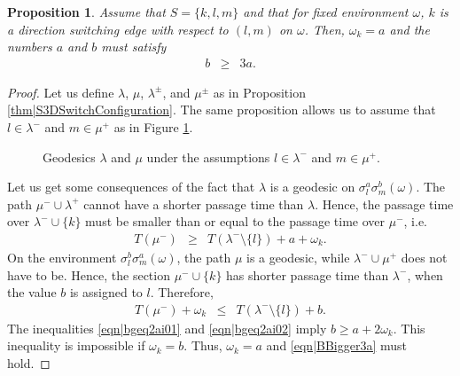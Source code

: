 \documentclass[reqno]{amsart}
\newtheorem{proposition}[theorem]{Proposition}
\begin{document}
\begin{proposition}\label{thm|dSwitchImpliesOmegaKEqA}
Assume that $S=\{k,l,m\}$ and that for fixed environment $\omega$, $k$ is a direction switching edge with respect to 
$(l,m)$ on $\omega$. Then, $\omega_k=a$ and the numbers $a$ and $b$ must satisfy 
\begin{eqnarray} b&\geq&3a.\label{eqn|BBigger3a}
\end{eqnarray}
\end{proposition}
\begin{proof} 
Let us define $\lambda$, $\mu$, $\lambda^{\pm}$, and $\mu^{\pm}$ as in Proposition \ref{thm|S3DSwitchConfiguration}. The same proposition allows us to assume that $l\in \lambda^-$ and $m\in \mu^+$ as in Figure \ref{fig|DSwitchNonTrivialCase}.

 \begin{figure}[t]
 \centering
{}
\caption{Geodesics $\lambda$ and $\mu$ under the assumptions $l\in\lambda^-$ and $m\in \mu^+$.}
\label{fig|DSwitchNonTrivialCase}
\end{figure}
Let us get some consequences of the fact that $\lambda$ is a geodesic on 
$\sigma_l^a\sigma_m^b(\omega)$. The path $\mu^-\cup \lambda^+$ cannot have a shorter passage time than $\lambda$. Hence, 
the passage time over $\lambda^-\cup \{k\}$ must be smaller than or equal to the passage time over $\mu^-$, i.e. 
\begin{eqnarray}T(\mu^-)&\geq& T(\lambda^-\setminus\{l\})+a+\omega_k.
\label{eqn|bgeq2ai01}
\end{eqnarray} 
On the environment
$\sigma_l^b\sigma_m^a(\omega)$, the path $\mu$ is a geodesic, while $\lambda^-\cup\mu^+$ does not have to be. Hence, the section $\mu^-\cup\{k\}$ has shorter passage time than $\lambda^-$, when the value $b$ is assigned to $l$. Therefore, 
\begin{eqnarray}
T(\mu^-)+\omega_k&\leq& T(\lambda^-\setminus\{l\})+b. 
\label{eqn|bgeq2ai02}
\end{eqnarray}
The inequalities \eqref{eqn|bgeq2ai01} and \eqref{eqn|bgeq2ai02} imply $b\geq a+2\omega_k$. This inequality is impossible if $\omega_k=b$. Thus, $\omega_k=a$ and 
\eqref{eqn|BBigger3a} must hold.
\end{proof}
\end{document}
